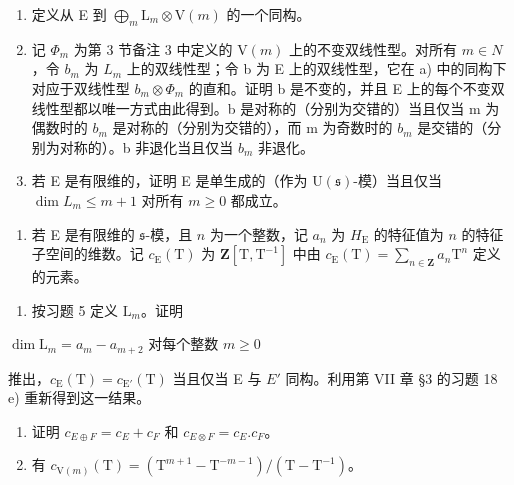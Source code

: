\begin{enumerate}
\def\labelenumi{\alph{enumi})}
\item
  定义从 E 到 \(\bigoplus_{m} \mathrm{L}_{m} \otimes \mathrm{V}(m)\) 的一个同构。
\item
  记 \(\Phi_{m}\) 为第 3 节备注 3 中定义的 \(\mathrm{V}(m)\) 上的不变双线性型。对所有 \(m \in N\)，令 \(b_{m}\) 为 \(L_{m}\) 上的双线性型；令 b 为 E 上的双线性型，它在 a) 中的同构下对应于双线性型 \(b_{m} \otimes \Phi_{m}\) 的直和。证明 b 是不变的，并且 E 上的每个不变双线性型都以唯一方式由此得到。b 是对称的（分别为交错的）当且仅当 m 为偶数时的 \(b_{m}\) 是对称的（分别为交错的），而 m 为奇数时的 \(b_{m}\) 是交错的（分别为对称的）。b 非退化当且仅当 \(b_{m}\) 非退化。
\item
  若 E 是有限维的，证明 E 是单生成的（作为 \(\mathrm{U}(\mathfrak{s})\)-模）当且仅当 \(\dim L_{m} \leq m + 1\) 对所有 \(m \geq 0\) 都成立。
\end{enumerate}

\begin{enumerate}
\def\labelenumi{\arabic{enumi})}
\setcounter{enumi}{5}
\tightlist
\item
  若 E 是有限维的 \(\mathfrak{s}\)-模，且 \(n\) 为一个整数，记 \(a_{n}\) 为 \(H_{\mathrm{E}}\) 的特征值为 \(n\) 的特征子空间的维数。记 \(c_{\mathrm{E}}(\mathrm{T})\) 为 \(\mathbf{Z}[\mathrm{T},\mathrm{T}^{-1}]\) 中由 \(c_{\mathrm{E}}(\mathrm{T}) = \sum_{n\in \mathbf{Z}}a_n\mathrm{T}^n\) 定义的元素。
\end{enumerate}

\begin{enumerate}
\def\labelenumi{\alph{enumi})}
\tightlist
\item
  按习题 5 定义 \(\mathrm{L}_m\)。证明
\end{enumerate}

\(\dim \mathrm{L}_m = a_m - a_{m + 2}\) 对每个整数 \(m\geq 0\)

推出，\(c_{\mathrm{E}}(\mathrm{T}) = c_{\mathrm{E}'}(\mathrm{T})\) 当且仅当 E 与 \(E'\) 同构。利用第 VII 章 §3 的习题 18 e) 重新得到这一结果。

\begin{enumerate}
\def\labelenumi{\alph{enumi})}
\setcounter{enumi}{1}
\item
  证明 \(c_{E\oplus F} = c_{E} + c_{F}\) 和 \(c_{E\otimes F} = c_{E}.c_{F}\)。
\item
  有 \(c_{\mathrm{V}(m)}(\mathrm{T}) = (\mathrm{T}^{m + 1} - \mathrm{T}^{-m - 1}) / (\mathrm{T} - \mathrm{T}^{-1})\)。
\end{enumerate}

